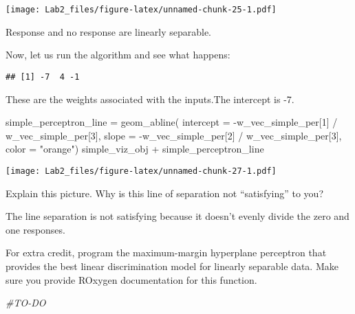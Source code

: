 \documentclass[
]{article}
\newenvironment{Shaded}{\begin{snugshade}}{\end{snugshade}}
\newcommand{\AttributeTok}[1]{\textcolor[rgb]{0.77,0.63,0.00}{#1}}
\newcommand{\CommentTok}[1]{\textcolor[rgb]{0.56,0.35,0.01}{\textit{#1}}}
\newcommand{\DecValTok}[1]{\textcolor[rgb]{0.00,0.00,0.81}{#1}}
\newcommand{\FunctionTok}[1]{\textcolor[rgb]{0.00,0.00,0.00}{#1}}
\newcommand{\NormalTok}[1]{#1}
\newcommand{\OtherTok}[1]{\textcolor[rgb]{0.56,0.35,0.01}{#1}}
\newcommand{\SpecialCharTok}[1]{\textcolor[rgb]{0.00,0.00,0.00}{#1}}
\newcommand{\StringTok}[1]{\textcolor[rgb]{0.31,0.60,0.02}{#1}}
\begin{document}
\texttt{[image: Lab2\_files/figure-latex/unnamed-chunk-25-1.pdf]}

Response and no response are linearly separable.

Now, let us run the algorithm and see what happens:

\begin{Shaded}
\end{Shaded}

\begin{verbatim}
## [1] -7  4 -1
\end{verbatim}

These are the weights associated with the inputs.The intercept is -7.

\begin{Shaded}
\begin{Highlighting}[]
\NormalTok{simple\_perceptron\_line }\OtherTok{=} \FunctionTok{geom\_abline}\NormalTok{(}
  \AttributeTok{intercept =} \SpecialCharTok{{-}}\NormalTok{w\_vec\_simple\_per[}\DecValTok{1}\NormalTok{] }\SpecialCharTok{/}\NormalTok{ w\_vec\_simple\_per[}\DecValTok{3}\NormalTok{], }
  \AttributeTok{slope =} \SpecialCharTok{{-}}\NormalTok{w\_vec\_simple\_per[}\DecValTok{2}\NormalTok{] }\SpecialCharTok{/}\NormalTok{ w\_vec\_simple\_per[}\DecValTok{3}\NormalTok{], }
  \AttributeTok{color =} \StringTok{"orange"}\NormalTok{)}
\NormalTok{simple\_viz\_obj }\SpecialCharTok{+}\NormalTok{ simple\_perceptron\_line}
\end{Highlighting}
\end{Shaded}

\texttt{[image: Lab2\_files/figure-latex/unnamed-chunk-27-1.pdf]}

Explain this picture. Why is this line of separation not ``satisfying''
to you?

The line separation is not satisfying because it doesn't evenly divide
the zero and one responses.

For extra credit, program the maximum-margin hyperplane perceptron that
provides the best linear discrimination model for linearly separable
data. Make sure you provide ROxygen documentation for this function.

\begin{Shaded}
\begin{Highlighting}[]
\CommentTok{\#TO{-}DO}
\end{Highlighting}
\end{Shaded}
\end{document}

